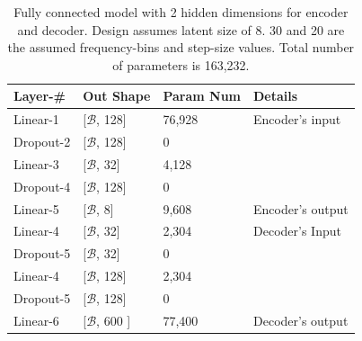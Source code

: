 \documentclass[\main/thesis.tex]{subfiles}
\begin{document}
\begin{table}[]

\begin{tabular}{|p{28mm}|p{25mm}|p{23mm}|p{50mm}|}
\hline
Layer-\# & Out Shape & Param Num & Details  \\ \hline
Linear-1 & [$\mathcal{B}$, 128]  & 76,928 & Encoder's input \\ \hline
Dropout-2 & [$\mathcal{B}$, 128] & 0 &  \\ \hline
Linear-3 & [$\mathcal{B}$, 32]  & 4,128 & \\ \hline
Dropout-4 & [$\mathcal{B}$, 128] & 0 &  \\ \hline
Linear-5 & [$\mathcal{B}$, 8] & 9,608 & Encoder's output \\ \hline
Linear-4 & [$\mathcal{B}$, 32] & 2,304 & Decoder's Input \\ \hline
Dropout-5 & [$\mathcal{B}$, 32]  & 0 &  \\ \hline
Linear-4 & [$\mathcal{B}$, 128] & 2,304 & \\ \hline
Dropout-5 & [$\mathcal{B}$, 128]  & 0 &  \\ \hline
Linear-6  & [$\mathcal{B}$, 600 ] &  77,400 &Decoder's output\\ \hline
\end{tabular}
\caption{Fully connected model with 2 hidden dimensions for encoder and decoder. Design assumes latent size of 8. 30 and 20 are the assumed frequency-bins and step-size values. Total number of parameters is 163,232.}
\label{table:FC2_AUTOENCODER}
\end{table}
\end{document}
